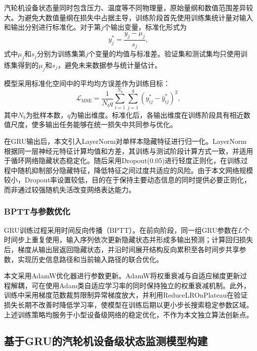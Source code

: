 汽轮机设备状态量同时包含压力、温度等不同物理量，原始量纲和数值范围差异较大。为避免大数值量纲在损失中占据主导，训练阶段首先使用训练集统计量对输入和输出分别进行标准化。对于第$j$个输出变量，标准化形式为
\begin{equation}
y_j^{*}=\frac{y_j-\mu_j}{s_j},
\end{equation}
式中$\mu_j$和$s_j$分别为训练集第$j$个变量的均值与标准差。验证集和测试集均只使用训练集得到的$\mu_j$和$s_j$，避免未来数据参与统计量估计。

模型采用标准化空间中的平均均方误差作为训练目标：
\begin{equation}
\mathcal{L}_{\mathrm{MSE}}=\frac{1}{N_bq}\sum_{i=1}^{N_b}\sum_{j=1}^{q}\left(y_{ij}^{*}-\hat{y}_{ij}^{*}\right)^2,
\end{equation}
其中$N_b$为批样本数，$q$为输出维度。标准化后，各输出维度在训练阶段具有相近数值尺度，使多输出任务能够在统一损失中共同参与优化。

在GRU输出后，本文引入LayerNorm对单样本隐藏特征进行归一化。LayerNorm根据同一层神经元特征计算均值和方差，其训练与测试阶段计算方式一致，并适用于循环网络隐藏状态稳定化\cite{Ba2016LayerNorm}。随后采用Dropout(0.05)进行轻度正则化，在训练过程中随机抑制部分隐藏特征，降低特征之间过度共适应的风险\cite{Srivastava2014Dropout}。由于本文网络规模较小，Dropout率设置较低，目的在于保持主要动态信息的同时提供必要正则化，而非通过较强随机失活改变网络表达能力。

\subsubsection{BPTT与参数优化}

GRU训练过程采用时间反向传播（BPTT）。在前向阶段，同一组GRU参数在$L$个时间步上重复使用，输入序列依次更新隐藏状态并形成多输出预测；计算回归损失后，梯度从输出层返回隐藏状态，并沿时间展开结构反向累积至各时间步共享参数，实现历史信息路径和当前输入路径的联合优化。

本文采用AdamW优化器进行参数更新。AdamW将权重衰减与自适应梯度更新过程解耦，可在使用Adam类自适应学习率的同时保持独立的权重衰减机制\cite{Loshchilov2019AdamW}。此外，训练中采用梯度范数裁剪限制异常梯度放大，并利用ReduceLROnPlateau在验证损失长期不改善时降低学习率，使模型在训练后期以更小步长搜索稳定参数区域。上述训练策略均服务于小型设备级网络的稳定优化，不作为本文独立算法创新点。

\subsection{基于GRU的汽轮机设备级状态监测模型构建}
\label{subsec:device_model_construction_v4}

